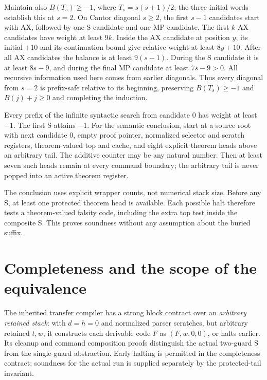 Maintain also $B(T_s)\ge-1$, where $T_s=s(s+1)/2$; the three initial words establish this at $s=2$. On Cantor diagonal $s\ge2$, the first $s-1$ candidates start with AX, followed by one S candidate and one MP candidate. The first $k$ AX candidates have weight at least $9k$. Inside the AX candidate at position $y$, its initial $+10$ and its continuation bound give relative weight at least $8y+10$. After all AX candidates the balance is at least $9(s-1)$. During the S candidate it is at least $8s-9$, and during the final MP candidate at least $7s-9>0$. All recursive information used here comes from earlier diagonals. Thus every diagonal from $s=2$ is prefix-safe relative to its beginning, preserving $B(T_s)\ge-1$ and $B(j)+j\ge0$ and completing the induction.

\begin{theorem}
Every prefix of the infinite syntactic search from candidate 0 has weight at least $-1$. The first S attains $-1$. For the semantic conclusion, start at a source root with next candidate 0, empty proof pointer, normalized selector and scratch registers, theorem-valued top and cache, and eight explicit theorem heads above an arbitrary tail. The additive counter may be any natural number. Then at least seven such heads remain at every command boundary; the arbitrary tail is never popped into an active theorem register.
\end{theorem}
The conclusion uses explicit wrapper counts, not numerical stack size. Before any S, at least one protected theorem head is available. Each possible halt therefore tests a theorem-valued falsity code, including the extra top test inside the composite S. This proves soundness without any assumption about the buried suffix.

\section{Completeness and the scope of the equivalence}
The inherited transfer compiler has a strong block contract over an \emph{arbitrary retained stack}: with $d=h=0$ and normalized parser scratches, but arbitrary retained $t,w$, it constructs each derivable code $F$ as $(F,w,0,0)$, or halts earlier. Its cleanup and command composition proofs distinguish the actual two-guard S from the single-guard abstraction. Early halting is permitted in the completeness contract; soundness for the actual run is supplied separately by the protected-tail invariant.

